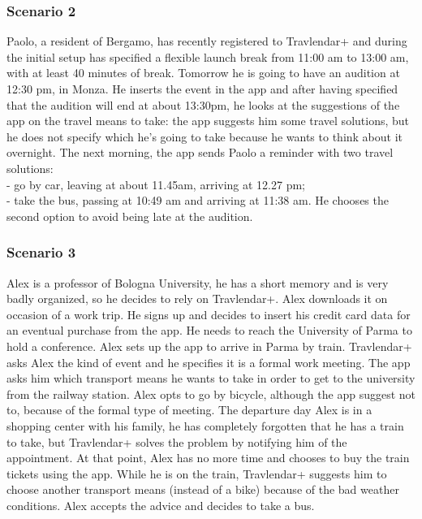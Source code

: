	\subsubsection{Scenario 2}
	Paolo, a resident of Bergamo, has recently registered to Travlendar+ and during	the initial setup has specified a flexible launch break from 11:00 am to 13:00 am, with at least 40 minutes of break.\newline
	Tomorrow he is going to have an audition at 12:30 pm, in Monza. He inserts the event in the app and after having specified that the audition will end at about 13:30pm, he looks at the suggestions of the app on the travel means to take: the app suggests him some travel solutions, but he does not specify which he's going to take because he wants to think about it overnight.\newline
	The next morning, the app sends Paolo a reminder with two travel solutions:\\
	\indent- go by car, leaving at about 11.45am, arriving at 12.27 pm;\\
	\indent - take the bus, passing at 10:49 am and arriving at 11:38 am.
	\newline He chooses the second option to avoid being late at the audition.
	\subsubsection{Scenario 3}
	Alex is a professor of Bologna University, he has a short memory and is very badly organized, so he decides to rely on Travlendar+. Alex downloads it on occasion of a work trip. He signs up and decides to insert his credit card data for an eventual purchase from the app.\newline
	He needs to reach the University of Parma to hold a conference. Alex sets up the app to arrive in Parma by train. Travlendar+ asks Alex the kind of event and he specifies it is a formal work meeting. The app asks him which transport means he wants to take in order to get to the university from the railway station. Alex opts to go by bicycle, although the app suggest not to, because of the formal type of meeting.\newline
	The departure day Alex is in a shopping center with his family, he has completely forgotten that he has a train to take, but Travlendar+ solves the problem by notifying him of the appointment. At that point, Alex has no more time and chooses to buy the train tickets using the app. While he is on the train, Travlendar+ suggests him to choose another transport means (instead of a bike) because of the bad weather conditions. Alex accepts the advice and decides to take a bus.
